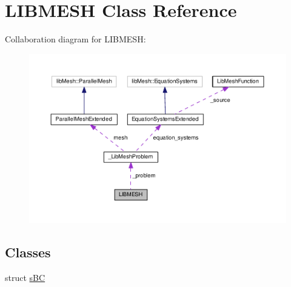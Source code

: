 \hypertarget{class_l_i_b_m_e_s_h}{\section{L\-I\-B\-M\-E\-S\-H Class Reference}
\label{class_l_i_b_m_e_s_h}
}


Collaboration diagram for L\-I\-B\-M\-E\-S\-H\-:\nopagebreak
\begin{figure}[H]
\begin{center}
\leavevmode
\includegraphics[width=350pt]{class_l_i_b_m_e_s_h__coll__graph}
\end{center}
\end{figure}
\subsection*{Classes}
\begin{DoxyCompactItemize}
\item 
struct \hyperlink{struct_l_i_b_m_e_s_h_1_1s_b_c}{s\-B\-C}
\end{DoxyCompactItemize}
